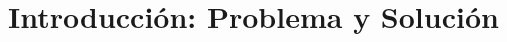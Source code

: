 \documentclass[a4paper,12pt]{report}
\begin{document}
%


\chapter{Introducción: Problema y Solución}


%

%

%

%


%
\end{document}
